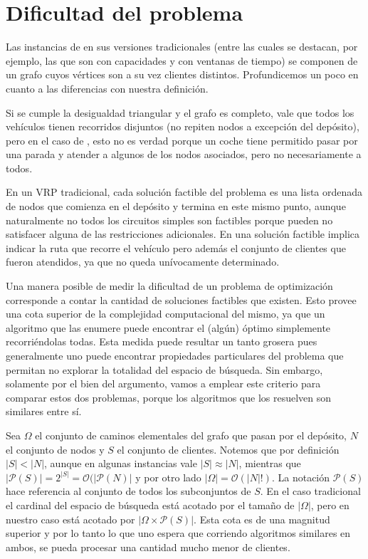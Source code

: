 \section{Dificultad del problema}
\label{section:complexity}

Las instancias de  en sus versiones tradicionales (entre las cuales se destacan, por ejemplo, las que son con capacidades y con ventanas de tiempo) se componen de un grafo cuyos vértices son a su vez clientes distintos. Profundicemos un poco en cuanto a las diferencias con nuestra definición.

Si se cumple la desigualdad triangular y el grafo es completo, vale que todos los vehículos tienen recorridos disjuntos (no repiten nodos a excepción del depósito), pero en el caso de , esto no es verdad porque un coche tiene permitido pasar por una parada y atender a algunos de los nodos asociados, pero no necesariamente a todos. 

En un VRP tradicional, cada solución factible del problema es una lista ordenada de nodos que comienza en el depósito y termina en este mismo punto, aunque naturalmente no todos los circuitos simples son factibles porque pueden no satisfacer alguna de las restricciones adicionales. En  una solución factible implica indicar la ruta que recorre el vehículo pero además el conjunto de clientes que fueron atendidos, ya que no queda unívocamente determinado. 

Una manera posible de medir la dificultad de un problema de optimización corresponde a contar la cantidad de soluciones factibles que existen. Esto provee una cota superior de la complejidad computacional del mismo, ya que un algoritmo que las enumere puede encontrar el (algún) óptimo simplemente recorriéndolas todas. Esta medida puede resultar un tanto grosera pues generalmente uno puede encontrar propiedades particulares del problema que permitan no explorar la totalidad del espacio de búsqueda. Sin embargo, solamente por el bien del argumento, vamos a emplear este criterio para comparar estos dos problemas, porque los algoritmos que los resuelven son similares entre sí.

Sea $\Omega$ el conjunto de caminos elementales del grafo que pasan por el depósito, $N$ el conjunto de nodos y $S$ el conjunto de clientes. Notemos que por definición $|S| < |N|$, aunque en algunas instancias vale $|S| \approx |N|$, mientras que $|\mathscr{P}(S)| = 2^{|S|} = \mathcal{O}(|\mathscr{P}(N)|$ y por otro lado $|\Omega| = \mathcal{O}(|N|!)$. La notación $\mathscr{P}(S)$ hace referencia al conjunto de todos los subconjuntos de $S$. En el caso tradicional el cardinal del espacio de búsqueda está acotado por el tamaño de $|\Omega|$, pero en nuestro caso está acotado por $|\Omega \times \mathscr{P}(S)|$. Esta cota es de una magnitud superior y por lo tanto lo que uno espera que corriendo algoritmos similares en ambos, se pueda procesar una cantidad mucho menor de clientes.  


